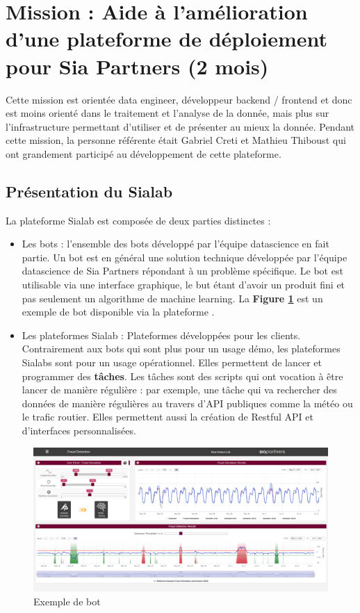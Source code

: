 \documentclass{article} %
\begin{document}
{\newpage

\section{Mission : Aide à l'amélioration d'une plateforme de déploiement pour Sia Partners (2 mois)}
Cette mission est orientée data engineer, développeur backend / frontend et donc est moins orienté dans le traitement et l'analyse de la donnée, mais plus sur l'infrastructure permettant d'utiliser et de présenter au mieux la donnée. Pendant cette mission, la personne référente était Gabriel Creti et Mathieu Thiboust qui ont grandement participé au développement de cette plateforme.
 
\subsection{Présentation du Sialab}
La plateforme Sialab est composée de deux parties distinctes :
\begin{itemize}
 \item Les bots : l'ensemble des bots développé par l'équipe datascience en fait partie. Un bot est en général une solution technique développée par l'équipe datascience de Sia Partners répondant à un problème spécifique. Le bot est utilisable via une interface graphique, le but étant d'avoir un produit fini et pas seulement un algorithme de machine learning. La \textbf{Figure \ref{fig:bot}} est un exemple de bot disponible via la plateforme \cite{bot}.
 \item Les plateformes Sialab : Plateformes développées pour les clients. Contrairement aux bots qui sont plus pour un usage démo, les plateformes Sialabs sont pour un usage opérationnel. Elles permettent de lancer et programmer des \textbf{tâches}. Les tâches sont des scripts qui ont vocation à être lancer de manière régulière : par exemple, une tâche qui va rechercher des données de manière régulières au travers d'API publiques comme la météo ou le trafic routier. Elles permettent aussi la création de Restful API et d'interfaces personnalisées.
\end{itemize}

\begin{figure}[!h]
 \centering
 \includegraphics[keepaspectratio = true,scale=0.25]{bot.png}
 \caption{Exemple de bot}
 \label{fig:bot}
\end{figure}

}
\end{document}
